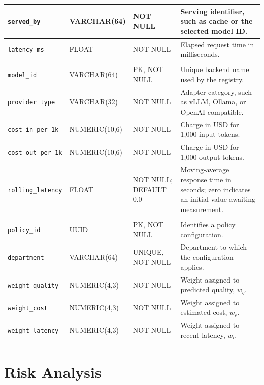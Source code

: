 \begin{longtable}{|>{\raggedright\arraybackslash}p{3.1cm}|>{\raggedright\arraybackslash}p{2.5cm}|>{\raggedright\arraybackslash}p{3.0cm}|>{\raggedright\arraybackslash}p{6.2cm}|}
\texttt{served\_by} & VARCHAR(64) & NOT NULL & Serving identifier, such as cache or the selected model ID. \\ \hline
\texttt{latency\_ms} & FLOAT & NOT NULL & Elapsed request time in milliseconds. \\ \hline
\multicolumn{4}{|c|}{\textbf{MODEL}} \\ \hline
\texttt{model\_id} & VARCHAR(64) & PK, NOT NULL & Unique backend name used by the registry. \\ \hline
\texttt{provider\_type} & VARCHAR(32) & NOT NULL & Adapter category, such as vLLM, Ollama, or OpenAI-compatible. \\ \hline
\texttt{cost\_in\_per\_1k} & NUMERIC(10,6) & NOT NULL & Charge in USD for 1,000 input tokens. \\ \hline
\texttt{cost\_out\_per\_1k} & NUMERIC(10,6) & NOT NULL & Charge in USD for 1,000 output tokens. \\ \hline
\texttt{rolling\_latency} & FLOAT & NOT NULL; DEFAULT 0.0 & Moving-average response time in seconds; zero indicates an initial value awaiting measurement. \\ \hline
\multicolumn{4}{|c|}{\textbf{POLICY}} \\ \hline
\texttt{policy\_id} & UUID & PK, NOT NULL & Identifies a policy configuration. \\ \hline
\texttt{department} & VARCHAR(64) & UNIQUE, NOT NULL & Department to which the configuration applies. \\ \hline
\texttt{weight\_quality} & NUMERIC(4,3) & NOT NULL & Weight assigned to predicted quality, $w_q$. \\ \hline
\texttt{weight\_cost} & NUMERIC(4,3) & NOT NULL & Weight assigned to estimated cost, $w_c$. \\ \hline
\texttt{weight\_latency} & NUMERIC(4,3) & NOT NULL & Weight assigned to recent latency, $w_l$. \\ \hline
\end{longtable}
\endgroup

\section{Risk Analysis}
\label{sec:risk-analysis}

